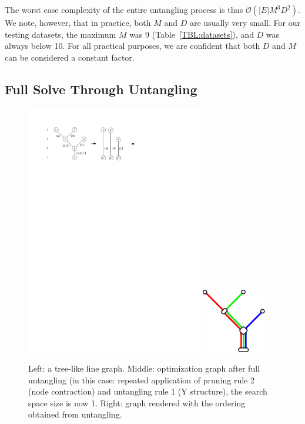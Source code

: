 \documentclass[format=acmsmall, review=false, screen=true]{acmart}
\begin{document}
The worst case complexity of the entire untangling process is thus $\mathcal{O}(|E|M^3D^2)$. We note, however, that in practice, both $M$ and $D$ are usually very small. For our testing datasets, the maximum $M$ was 9 (Table~\ref{TBL:datasets}), and $D$ was always below 10. For all practical purposes, we are confident that both $D$ and $M$ can be considered a constant factor.

\subsection{Full Solve Through Untangling}

\begin{figure}
  \centering
  \includegraphics[width=0.69\textwidth,page=1]{untangling/tree.pdf}
  \includegraphics[width=0.25\textwidth,page=1]{untangling/tree_map.pdf}

  \caption{Left: a tree-like line graph. Middle: optimization graph after full untangling (in this case: repeated application of pruning rule 2 (node contraction) and untangling rule 1 (Y structure), the search space size is now 1. Right: graph rendered with the ordering obtained from untangling.}
  \label{FIG:untangle_tree}
\end{figure}
\end{document}
